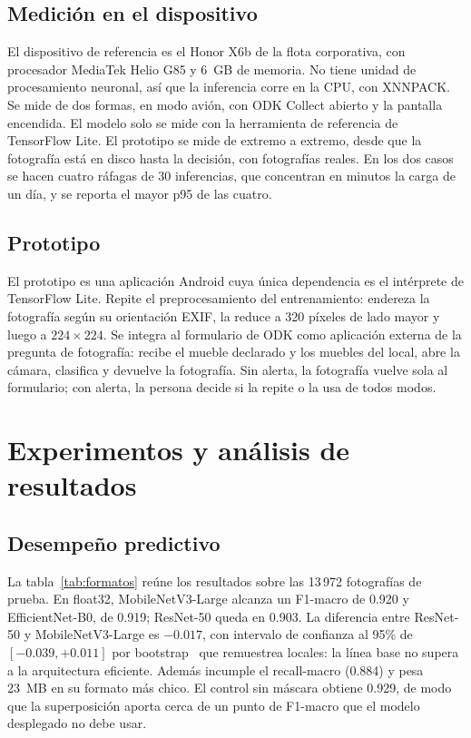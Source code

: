 \documentclass[conference]{IEEEtran}
\begin{document}
\subsection{Medición en el dispositivo}

El dispositivo de referencia es el Honor X6b de la flota corporativa, con procesador MediaTek Helio G85 y 6~GB de
memoria. No tiene unidad de procesamiento neuronal, así que la inferencia corre en la CPU, con XNNPACK. Se mide de
dos formas, en modo avión, con ODK Collect abierto y la pantalla encendida. El modelo solo se mide con la
herramienta de referencia de TensorFlow Lite. El prototipo se mide de extremo a extremo, desde que la fotografía
está en disco hasta la decisión, con fotografías reales. En los dos casos se hacen cuatro ráfagas de 30
inferencias, que concentran en minutos la carga de un día, y se reporta el mayor p95 de las cuatro.

\subsection{Prototipo}

El prototipo es una aplicación Android cuya única dependencia es el intérprete de TensorFlow Lite. Repite el
preprocesamiento del entrenamiento: endereza la fotografía según su orientación EXIF, la reduce a 320 píxeles de
lado mayor y luego a $224 \times 224$. Se integra al formulario de ODK como aplicación externa de la pregunta de
fotografía: recibe el mueble declarado y los muebles del local, abre la cámara, clasifica y devuelve la
fotografía. Sin alerta, la fotografía vuelve sola al formulario; con alerta, la persona decide si la repite o la
usa de todos modos.

\section{Experimentos y análisis de resultados}

\subsection{Desempeño predictivo}

La tabla~\ref{tab:formatos} reúne los resultados sobre las 13\,972 fotografías de prueba. En float32,
MobileNetV3-Large alcanza un F1-macro de 0.920 y EfficientNet-B0, de 0.919; ResNet-50 queda en 0.903. La
diferencia entre ResNet-50 y MobileNetV3-Large es $-0.017$, con intervalo de confianza al 95\% de
$[-0.039, +0.011]$ por bootstrap~\cite{efron1979} que remuestrea locales: la línea base no supera a la arquitectura
eficiente. Además incumple el recall-macro (0.884) y pesa 23~MB en su formato más chico. El control sin máscara
obtiene 0.929, de modo que la superposición aporta cerca de un punto de F1-macro que el modelo desplegado no debe
usar.
\end{document}
